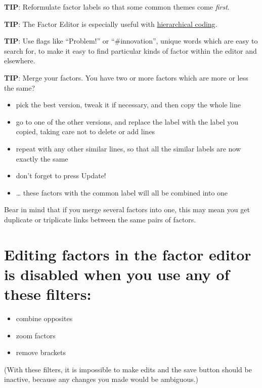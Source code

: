 \documentclass[
]{book}
\providecommand{\tightlist}{%
  \setlength{\itemsep}{0pt}\setlength{\parskip}{0pt}}
\begin{document}
\textbf{TIP}: Reformulate factor labels so that some common themes come \emph{first}.

\textbf{TIP}: The Factor Editor is especially useful with \href{\%7B\#xhierarchical-coding\%7D}{hierarchical coding}.

\textbf{TIP}: Use flags like ``Problem!'' or ``\#innovation'', unique words which are easy to search for, to make it easy to find particular kinds of factor within the editor and elsewhere.

\textbf{TIP}: Merge your factors. You have two or more factors which are more or less the same?

\begin{itemize}
\tightlist
\item
  pick the best version, tweak it if necessary, and then copy the whole line
\item
  go to one of the other versions, and replace the label with the label you copied, taking care not to delete or add lines
\item
  repeat with any other similar lines, so that all the similar labels are now exactly the same
\item
  don't forget to press Update!
\item
  \ldots{} these factors with the common label will all be combined into one
\end{itemize}

Bear in mind that if you merge several factors into one, this may mean you get duplicate or triplicate links between the same pairs of factors.

\hypertarget{editing-factors-in-the-factor-editor-is-disabled-when-you-use-any-of-these-filters}{%
\section{Editing factors in the factor editor is disabled when you use any of these filters:}\label{editing-factors-in-the-factor-editor-is-disabled-when-you-use-any-of-these-filters}}

\begin{itemize}
\tightlist
\item
  combine opposites
\item
  zoom factors
\item
  remove brackets
\end{itemize}

(With these filters, it is impossible to make edits and the save button should be inactive, because any changes you made would be ambiguous.)
\end{document}
